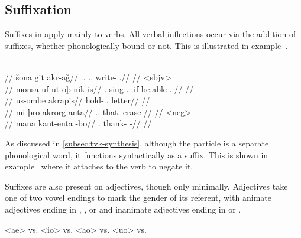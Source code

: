 \subsection{Suffixation}
\label{subsec:tvk-suffixation}

Suffixes in \langtvk{} apply mainly to verbs. All verbal inflections occur via the addition of suffixes, whether phonologically bound or not. This is illustrated in example~.

	\begingl
		\glpreamble{}\\
		//
		\gla šona git akr-aǧ//
		\glb \Tpp.\An.\Top{} \Tps.\In.\Acc{} write-\Ind.\Pst.\Rtsp//
		\glft {}//
	\endgl
	\a<sbjv>\begingl
		\glpreamble{}\\
		//
		\gla monsa uf-ut oþ nik-is//
		\glb \Fpc.\Top{} sing-\Ind.\Npst.\Pfv{} if be.able-\Sbjv.\Npst.\Ipfv//
		\glft {}//
	\endgl
	\a<iii:pptcp>\begingl
		\glpreamble{}\\
		//
		\gla us-ombe akrapis//
		\glb hold-\Pass.\Ptcp.\In{} letter//
		\glft {}//
	\endgl
	\a<i:imp>\begingl
		\glpreamble{}\\
		//
		\gla mi þro akrorg-anta//
		\glb \In.\Sg.\Top{} that.\Med{} erase-\Imp//
		\glft {}//
	\endgl
	\a<neg>\begingl
		\glpreamble{}\\
		//
		\gla mana kant-enta -bo//
		\glb \Fpp.\Top{} thank-\Imp{} -\Neg//
		\glft {}//
	\endgl
\xe

As discussed in \autoref{subsec:tvk-synthesis}, although the particle  is a separate phonological word, it functions syntactically as a suffix. This is shown in example~ where it attaches to the verb  to negate it.

Suffixes are also present on adjectives, though only minimally. Adjectives take one of two vowel endings to mark the gender of its referent, with animate adjectives ending in , , or  and inanimate adjectives ending in  or .

	\a<ae>  \gloss{\An} vs.   \gloss{\In} 
	\a<io>  \gloss{\An} vs.   \gloss{\In} 
	\a<ao>  \gloss{\An} vs.   \gloss{\In} 
	\a<uo>  \gloss{\An} vs.   \gloss{\In} 
\xe

